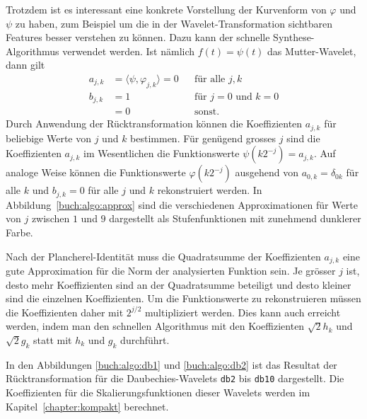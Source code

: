 Trotzdem ist es interessant eine konkrete Vorstellung der Kurvenform
von $\varphi$ und $\psi$ zu haben, zum Beispiel um die in der
Wavelet-Transformation sichtbaren Features besser verstehen
zu können.
Dazu kann der schnelle Synthese-Algorithmus verwendet werden.
Ist nämlich $f(t)=\psi(t)$ das Mutter-Wavelet, dann gilt
\[
\begin{aligned}
a_{j,k}
&=
\langle \psi, \varphi_{j,k}\rangle = 0 
& &\text{für alle $j,k$}
\\
b_{j,k}
&=1&&\text{für $j=0$ und $k=0$}
\\
&=0&&\text{sonst.}
\end{aligned}
\]
Durch Anwendung der Rücktransformation können die Koeffizienten 
$a_{j,k}$ für beliebige Werte von $j$ und $k$ bestimmen.
Für genügend grosses $j$ sind die Koeffizienten $a_{j,k}$ im Wesentlichen
die Funktionswerte $\psi(k2^{-j}) = a_{j,k}$.
Auf analoge Weise können die Funktionswerte $\varphi(k2^{-j})$
ausgehend von $a_{0,k}=\delta_{0k}$ für alle $k$
und $b_{j,k}=0$ für alle $j$ und $k$ rekonstruiert werden.
In Abbildung~\ref{buch:algo:approx} sind die verschiedenen Approximationen
für Werte von $j$ zwischen $1$ und $9$ dargestellt als Stufenfunktionen
mit zunehmend dunklerer Farbe.

Nach der Plancherel-Identität muss die Quadratsumme der Koeffizienten
$a_{j,k}$ eine gute Approximation für die Norm der analysierten Funktion
sein.
Je grösser $j$ ist, desto mehr Koeffizienten sind an der Quadratsumme
beteiligt und desto kleiner sind die einzelnen Koeffizienten.
Um die Funktionswerte zu rekonstruieren müssen die Koeffizienten
daher mit $2^{j/2}$ multipliziert werden.
Dies kann auch erreicht werden, indem man den schnellen Algorithmus
mit den Koeffizienten $\sqrt{2} h_k$ und
$\sqrt{2} g_k$ statt mit $h_k$ und $g_k$ durchführt.

In den Abbildungen \ref{buch:algo:db1} und \ref{buch:algo:db2}
ist das Resultat der Rücktransformation für die Daubechies-Wavelets
\texttt{db2} bis \texttt{db10} dargestellt.
Die Koeffizienten für die Skalierungsfunktionen dieser Wavelets werden
im Kapitel~\ref{chapter:kompakt} berechnet.

